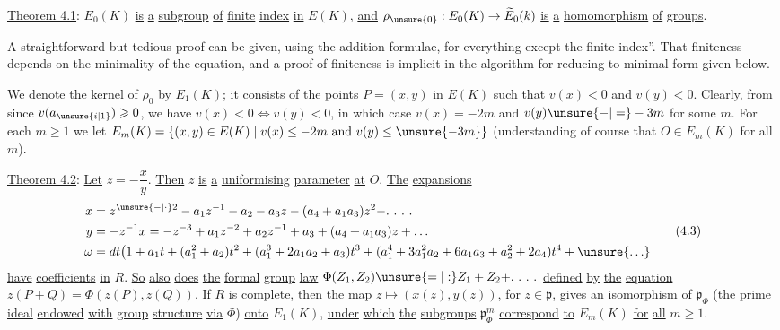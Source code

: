 \uline{Theorem 4.1}: $E_0(K)$ \uline{is} \uline{a} \uline{subgroup} \uline{of} \uline{finite} \uline{index} \uline{in} $E(K)$, \uline{and} $\rho_{\unsure{0}}:E_0(K)\to\widetilde E_0(k)$ \uline{is} \uline{a} \uline{homomorphism} \uline{of} \uline{groups}.

A straightforward but tedious proof can be given, using the addition formulae, for everything except the finite index''. That finiteness depends on the minimality of the equation, and a proof of finiteness is implicit in the algorithm for reducing to minimal form given below.

We denote the kernel of $\rho_0$ by $E_1(K)$; it consists of the points $P=(x,y)$ in $E(K)$ such that $v(x)<0$ and $v(y)<0$. Clearly, from  since $v(a_{\unsure{i|1}})\geqslant0$, we have $v(x)<0\Longleftrightarrow v(y)<0$, in which case $v(x)=-2m$ and $v(y)\unsure{-|=}-3m$ for some $m$. For each $m\geqslant1$ we let $E_m(K)=\{(x,y)\in E(K)\mid v(x)\leq-2m\ \text{and}\ v(y)\leq\unsure{-3m}\}$ (understanding of course that $O\in E_m(K)$ for all $m$).

\uline{Theorem 4.2}: \uline{Let} $z=-\dfrac{x}{y}$. \uline{Then} $z$ \uline{is} \uline{a} \uline{uniformising} \uline{parameter} \uline{at} $O$. \uline{The} \uline{expansions}
\begingroup\scriptsize
\[
\begin{aligned}
x&=z^{\unsure{-|\cdot}2}-a_1z^{-1}-a_2-a_3z-(a_4+a_1a_3)z^2
 -\ldotp\,\ldotp\,\ldotp\,\ldotp\\
y&=-z^{-1}x=-z^{-3}+a_1z^{-2}+a_2z^{-1}+a_3+(a_4+a_1a_3)z+\ldots\\
\omega&=dt\bigl(1+a_1t+(a_1^2+a_2)t^2+(a_1^3+2a_1a_2+a_3)t^3+
 (a_1^4+3a_1^2a_2+6a_1a_3+a_2^2+2a_4)t^4+\unsure{\ldots}
\end{aligned}
\tag*{(4.3)}
\]
\endgroup
\uline{have} \uline{coefficients} \uline{in} $R$. \uline{So} \uline{also} \uline{does} \uline{the} \uline{formal}
\uline{group} \uline{law} $\Phi(Z_1,Z_2)\unsure{=|:}Z_1+Z_2+\ldotp\,\ldotp\,\ldotp\,\ldotp$ \uline{defined} \uline{by} \uline{the} \uline{equation} $z(P+Q)=\Phi(z(P),z(Q))$. \uline{If} $R$ \uline{is} \uline{complete}, \uline{then} \uline{the} \uline{map} $z\longmapsto(x(z),y(z))$, \uline{for} $z\in\mathfrak{p}$, \uline{gives} \uline{an} \uline{isomorphism} \uline{of} $\mathfrak{p}_{\Phi}$ (\uline{the} \uline{prime} \uline{ideal} \uline{endowed} \uline{with} \uline{group} \uline{structure} \uline{via} $\Phi$) \uline{onto} $E_1(K)$, \uline{under} \uline{which} \uline{the} \uline{subgroups} $\mathfrak{p}^m_{\Phi}$ \uline{correspond} \uline{to} $E_m(K)$ \uline{for} \uline{all} $m\geqslant1$.
\endgroup

